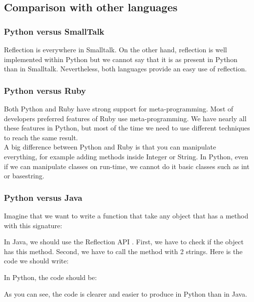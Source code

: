 \subsection{Comparison with other languages}

\subsubsection{Python versus SmallTalk}
Reflection is everywhere in Smalltalk. On the other hand, reflection is well implemented within Python but we cannot say that it is as present in Python than in Smalltalk. Nevertheless, both languages provide an easy use of reflection.

\subsubsection{Python versus Ruby}
\label{ruby_vs_python}
Both Python and Ruby have strong support for meta-programming. 
Most of developers preferred features of Ruby use meta-programming. 
We have nearly all these features in Python, but most of the time we need to use different techniques to reach the same result.\\

A big difference between Python and Ruby is that you can manipulate everything, for example adding methods inside Integer or String. In Python, even if we can manipulate classes on run-time, we cannot do it basic classes such as int or basestring.\\



\subsubsection{Python versus Java}
Imagine that we want to write a function that take any object that has a method with this signature:


In Java, we should use the Reflection API \cite{python_more_fun_java}. First, we have to check if the object has this method. Second, we have to call the method with 2 strings. Here is the code we should write:


In Python, the code should be:


As you can see, the code is clearer and easier to produce in Python than in Java.

